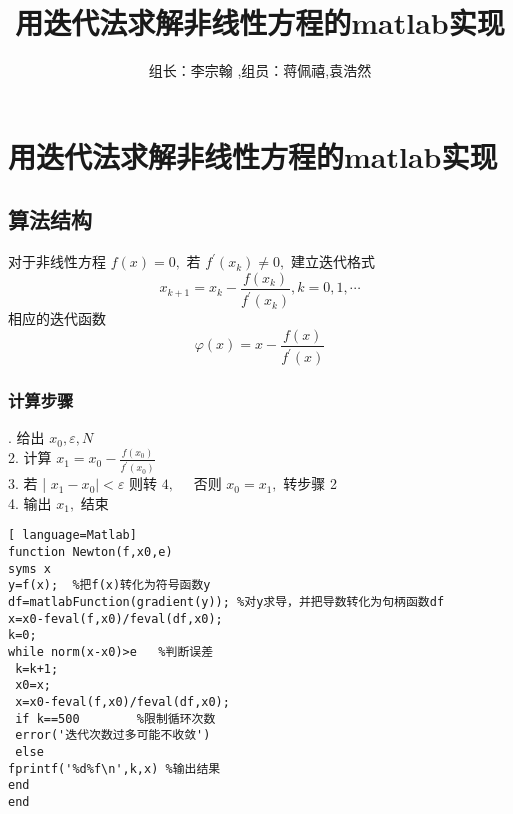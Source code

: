 \documentclass[cn,11pt,chinese,black]{elegantbook}
\title{用迭代法求解非线性方程的matlab实现}
\author{组长：李宗翰 ,组员：蒋佩禧,袁浩然}
\begin{document}
	\maketitle
	\chapter{用迭代法求解非线性方程的matlab实现}
	\section{算法结构}
	对于非线性方程 $f(x)=0,$ 若 $f^{\prime}\left(x_{k}\right) \neq 0,$ 建立迭代格式
	\[
	x_{k+1}=x_{k}-\frac{f\left(x_{k}\right)}{f^{\prime}\left(x_{k}\right)}, k=0,1, \cdots
	\]
	相应的迭代函数
	\[
	\varphi(x)=x-\frac{f(x)}{f^{\prime}(x)}
	\]
	\subsection{计算步骤}
. 给出 $x_{0}, \varepsilon, N$ \\
	2. 计算 $x_{1}=x_{0}-\frac{f\left(x_{0}\right)}{f^{\prime}\left(x_{0}\right)}$ \\
	3. 若 | $x_{1}-x_{0} \mid<\varepsilon$ 则转 $4, \quad$ 否则 $x_{0}=x_{1},$ 转步骤 2 \\
	4. 输出 $x_{1},$ 结束
\begin{lstlisting}[ language=Matlab] 
function Newton(f,x0,e)
syms x
y=f(x);  %把f(x)转化为符号函数y
df=matlabFunction(gradient(y)); %对y求导，并把导数转化为句柄函数df
x=x0-feval(f,x0)/feval(df,x0);
k=0;
while norm(x-x0)>e   %判断误差
 k=k+1;
 x0=x;
 x=x0-feval(f,x0)/feval(df,x0);
 if k==500        %限制循环次数
 error('迭代次数过多可能不收敛')
 else 
fprintf('%d%f\n',k,x) %输出结果
end
end
\end{lstlisting}
\end{document}
